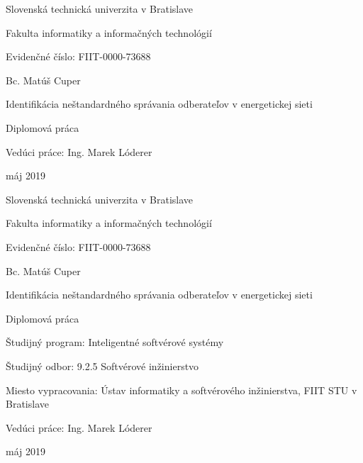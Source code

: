 \documentclass[a4paper,twoside,slovak,12pt]{article}
\begin{document}
\begin{titlepage}
	\centering
	{\Large Slovenská technická univerzita v Bratislave \par}
	{\Large Fakulta informatiky a informačných technológií \par}
  \vspace{0.5cm}
  {\normalsize Evidenčné číslo: FIIT-0000-73688 \par}
	\vspace{7cm}
  {\large Bc. Matúš Cuper \par}
  \vspace{0.5cm}
	{\LARGE Identifikácia neštandardného správania odberateľov v energetickej sieti \par}
	\vspace{0.5cm}
	{\large Diplomová práca \par}
	\vspace{7cm}
  \flushleft
	{\large Vedúci práce: Ing. Marek Lóderer \par}
  \vspace{0.5cm}
  {\large máj 2019 \par}
	\vfill
\end{titlepage}

\begin{titlepage}
	\centering
  {\Large Slovenská technická univerzita v Bratislave \par}
	{\Large Fakulta informatiky a informačných technológií \par}
  \vspace{0.5cm}
  {\normalsize Evidenčné číslo: FIIT-0000-73688 \par}
	\vspace{7cm}
  {\large Bc. Matúš Cuper \par}
  \vspace{0.5cm}
	{\LARGE Identifikácia neštandardného správania odberateľov v energetickej sieti \par}
	\vspace{0.5cm}
	{\large Diplomová práca \\}
	\vspace{7cm}
  \flushleft
  {\normalsize Študijný program: Inteligentné softvérové systémy \par}
	{\normalsize Študijný odbor: 9.2.5 Softvérové inžinierstvo \par}
	{\normalsize Miesto vypracovania: Ústav informatiky a softvérového inžinierstva, FIIT STU v Bratislave \par}
	{\normalsize Vedúci práce: Ing. Marek Lóderer \par}
  \vspace{0.5cm}
  {\normalsize máj 2019 \par}
\end{titlepage}
\end{document}
